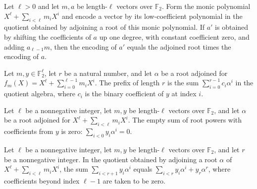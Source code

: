 \begin{theorem}
\label{FABL.binaryAdjoinRootEncode_binaryXMulMod}
\leanok
{}
Let $\ell>0$ and let $m,a$ be length-$\ell$ vectors over $\mathbb F_2$. Form the monic
polynomial $X^{\ell}+\sum_{i<\ell}m_iX^i$ and encode a vector by its low-coefficient
polynomial in the quotient obtained by adjoining a root of this monic polynomial. If
$a'$ is obtained by shifting the coefficients of $a$ up one degree, with constant
coefficient zero, and adding $a_{\ell-1}m$, then the encoding of $a'$ equals the
adjoined root times the encoding of $a$.
\end{theorem}

\begin{definition}
\label{FABL.binaryAdjoinRootPrefix}
\leanok
{}
Let $m,y\in\mathbb{F}_2^\ell$, let $r$ be a natural number, and let $\alpha$ be a root
adjoined for $f_m(X)=X^\ell+\sum_{i=0}^{\ell-1}m_iX^i$. The prefix of length $r$ is the
sum $\sum_{i=0}^{r-1} c_i\alpha^i$ in the quotient algebra, where $c_i$ is the binary
coefficient of $y$ at index $i$.
\end{definition}

\begin{theorem}
\label{FABL.binaryAdjoinRootPrefix_zero}
\leanok
{}
Let $\ell$ be a nonnegative integer, let $m,y$ be length-$\ell$ vectors over $\mathbb
F_2$, and let $\alpha$ be a root adjoined for $X^\ell+\sum_{i<\ell}m_iX^i$. The empty
sum of root powers with coefficients from $y$ is zero: $\sum_{i<0} y_i\alpha^i=0$.
\end{theorem}

\begin{theorem}
\label{FABL.binaryAdjoinRootPrefix_succ}
\leanok
{}
Let $\ell$ be a nonnegative integer, let $m,y$ be length-$\ell$ vectors over $\mathbb
F_2$, and let $r$ be a nonnegative integer. In the quotient obtained by adjoining a root
$\alpha$ of $X^\ell+\sum_{i<\ell}m_iX^i$, the sum $\sum_{i<r+1} y_i\alpha^i$ equals
$\sum_{i<r} y_i\alpha^i+y_r\alpha^r$, where coefficients beyond index $\ell-1$ are taken
to be zero.
\end{theorem}


